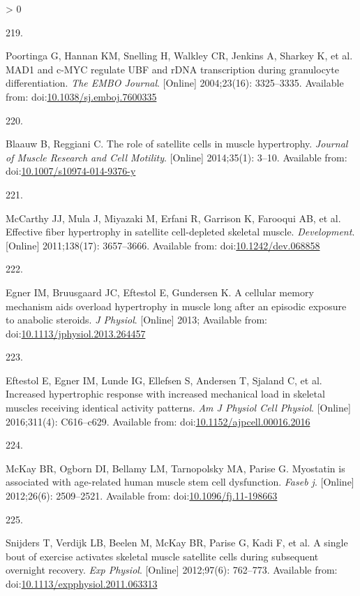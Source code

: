 \documentclass[twoside,10pt]{gihclass} %
\newlength{\cslhangindent}
\newlength{\csllabelwidth}
\newenvironment{CSLReferences}[3] %
 {%
  \setlength{\parindent}{0pt}
  \ifodd #1 \everypar{\setlength{\hangindent}{\cslhangindent}}\ignorespaces\fi
  \ifnum #2 > 0
  \setlength{\parskip}{#2\baselineskip}
  \fi
 }%
 {}
\newcommand{\CSLLeftMargin}[1]{\parbox[t]{\maxof{\widthof{#1}}{\csllabelwidth}}{#1}}
\newcommand{\CSLRightInline}[1]{\parbox[t]{\linewidth}{#1}}
\begin{document}
\begin{CSLReferences}{0}{0}
\leavevmode\hypertarget{ref-RN2565}{}%
\CSLLeftMargin{219. }
\CSLRightInline{Poortinga G, Hannan KM, Snelling H, Walkley CR, Jenkins A, Sharkey K, et al. MAD1 and c-MYC regulate UBF and rDNA transcription during granulocyte differentiation. \emph{The EMBO Journal}. {[}Online{]} 2004;23(16): 3325--3335. Available from: doi:\href{https://doi.org/10.1038/sj.emboj.7600335}{10.1038/sj.emboj.7600335}}

\leavevmode\hypertarget{ref-RN2080}{}%
\CSLLeftMargin{220. }
\CSLRightInline{Blaauw B, Reggiani C. The role of satellite cells in muscle hypertrophy. \emph{Journal of Muscle Research and Cell Motility}. {[}Online{]} 2014;35(1): 3--10. Available from: doi:\href{https://doi.org/10.1007/s10974-014-9376-y}{10.1007/s10974-014-9376-y}}

\leavevmode\hypertarget{ref-RN2864}{}%
\CSLLeftMargin{221. }
\CSLRightInline{McCarthy JJ, Mula J, Miyazaki M, Erfani R, Garrison K, Farooqui AB, et al. Effective fiber hypertrophy in satellite cell-depleted skeletal muscle. \emph{Development}. {[}Online{]} 2011;138(17): 3657--3666. Available from: doi:\href{https://doi.org/10.1242/dev.068858}{10.1242/dev.068858}}

\leavevmode\hypertarget{ref-RN912}{}%
\CSLLeftMargin{222. }
\CSLRightInline{Egner IM, Bruusgaard JC, Eftestol E, Gundersen K. A cellular memory mechanism aids overload hypertrophy in muscle long after an episodic exposure to anabolic steroids. \emph{J Physiol}. {[}Online{]} 2013; Available from: doi:\href{https://doi.org/10.1113/jphysiol.2013.264457}{10.1113/jphysiol.2013.264457}}

\leavevmode\hypertarget{ref-RN2104}{}%
\CSLLeftMargin{223. }
\CSLRightInline{Eftestol E, Egner IM, Lunde IG, Ellefsen S, Andersen T, Sjaland C, et al. Increased hypertrophic response with increased mechanical load in skeletal muscles receiving identical activity patterns. \emph{Am J Physiol Cell Physiol}. {[}Online{]} 2016;311(4): C616--c629. Available from: doi:\href{https://doi.org/10.1152/ajpcell.00016.2016}{10.1152/ajpcell.00016.2016}}

\leavevmode\hypertarget{ref-RN2872}{}%
\CSLLeftMargin{224. }
\CSLRightInline{McKay BR, Ogborn DI, Bellamy LM, Tarnopolsky MA, Parise G. Myostatin is associated with age-related human muscle stem cell dysfunction. \emph{Faseb j}. {[}Online{]} 2012;26(6): 2509--2521. Available from: doi:\href{https://doi.org/10.1096/fj.11-198663}{10.1096/fj.11-198663}}

\leavevmode\hypertarget{ref-RN1048}{}%
\CSLLeftMargin{225. }
\CSLRightInline{Snijders T, Verdijk LB, Beelen M, McKay BR, Parise G, Kadi F, et al. A single bout of exercise activates skeletal muscle satellite cells during subsequent overnight recovery. \emph{Exp Physiol}. {[}Online{]} 2012;97(6): 762--773. Available from: doi:\href{https://doi.org/10.1113/expphysiol.2011.063313}{10.1113/expphysiol.2011.063313}}


\end{CSLReferences}
\end{document}
